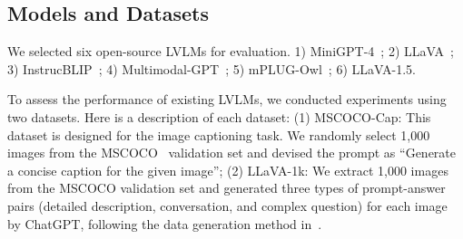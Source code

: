 \subsection{Models and Datasets}
We selected six open-source LVLMs for evaluation.
1) MiniGPT-4~\cite{minigpt4};
2) LLaVA~\cite{llava}; 
3) InstrucBLIP~\cite{InstructBLIP}; 
4) Multimodal-GPT~\cite{MultiModal-GPT}; 
5) mPLUG-Owl~\cite{mPLUG-Owl}; 
6) LLaVA-1.5.





To assess the performance of existing LVLMs, we conducted experiments using two datasets. Here is a description of each dataset:
(1) MSCOCO-Cap: This dataset is designed for the image captioning task. We randomly select 1,000 images from the MSCOCO~\cite{mscoco} validation set and devised the prompt as ``Generate a concise caption for the given image''; 
(2) LLaVA-1k: We extract 1,000 images from the MSCOCO validation set and generated three types of prompt-answer pairs (\ie detailed description, conversation, and complex question) for each image by ChatGPT, following the data generation method in~\cite{llava}.


